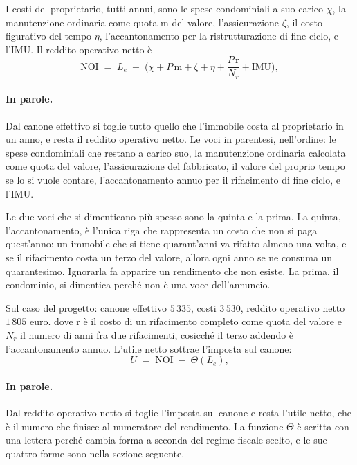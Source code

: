 \documentclass[11pt,a4paper]{article}
\theoremstyle{definition}
\theoremstyle{plain}
\begin{document}
I costi del proprietario, tutti annui, sono le spese condominiali a suo carico $\chi$, la manutenzione ordinaria come quota $\mathrm{m}$ del valore, l'assicurazione $\zeta$, il costo figurativo del tempo $\eta$, l'accantonamento per la ristrutturazione di fine ciclo, e l'IMU. Il reddito operativo netto è
\begin{equation}
\mathrm{NOI} \;=\; L_e \;-\; \Big(\chi + P\,\mathrm{m} + \zeta + \eta + \frac{P\,\mathrm{r}}{N_r} + \mathrm{IMU}\Big),
\label{eq:noi}
\end{equation}

\paragraph{In parole.} Dal canone effettivo si toglie tutto quello che l'immobile costa al proprietario in un anno, e resta il reddito operativo netto. Le voci in parentesi, nell'ordine: le spese condominiali che restano a carico suo, la manutenzione ordinaria calcolata come quota del valore, l'assicurazione del fabbricato, il valore del proprio tempo se lo si vuole contare, l'accantonamento annuo per il rifacimento di fine ciclo, e l'IMU.

Le due voci che si dimenticano più spesso sono la quinta e la prima. La quinta, l'accantonamento, è l'unica riga che rappresenta un costo che non si paga quest'anno: un immobile che si tiene quarant'anni va rifatto almeno una volta, e se il rifacimento costa un terzo del valore, allora ogni anno se ne consuma un quarantesimo. Ignorarla fa apparire un rendimento che non esiste. La prima, il condominio, si dimentica perché non è una voce dell'annuncio.

Sul caso del progetto: canone effettivo $5\,335$, costi $3\,530$, reddito operativo netto $1\,805$ euro.
dove $\mathrm{r}$ è il costo di un rifacimento completo come quota del valore e $N_r$ il numero di anni fra due rifacimenti, cosicché il terzo addendo è l'accantonamento annuo. L'utile netto sottrae l'imposta sul canone:
\begin{equation}
U \;=\; \mathrm{NOI} \;-\; \Theta(L_e),
\label{eq:utile}
\end{equation}

\paragraph{In parole.} Dal reddito operativo netto si toglie l'imposta sul canone e resta l'utile netto, che è il numero che finisce al numeratore del rendimento. La funzione $\Theta$ è scritta con una lettera perché cambia forma a seconda del regime fiscale scelto, e le sue quattro forme sono nella sezione seguente.
\end{document}
